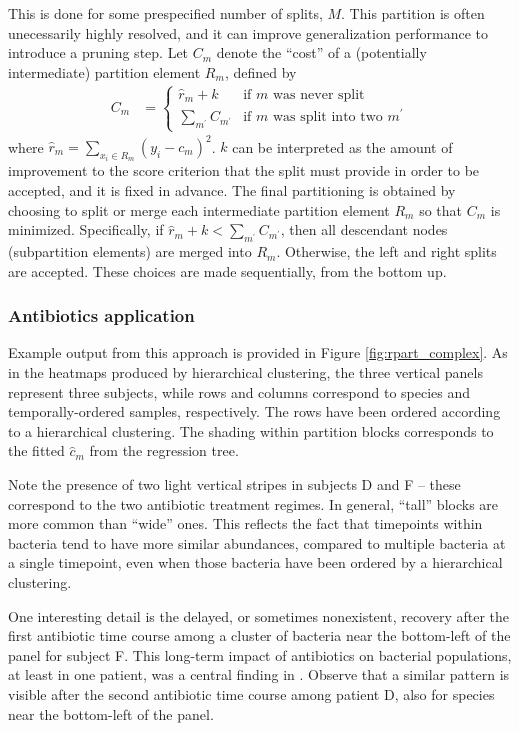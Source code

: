 \documentclass[14pt]{extreport}
\begin{document}
This is done for some prespecified number of splits, $M$. This partition is
often unecessarily highly resolved, and it can improve generalization
performance to introduce a pruning step. Let $C_{m}$ denote the ``cost'' of a
(potentially intermediate) partition element $R_{m}$, defined by
\begin{align*}
  C_{m} &= \begin{cases}
    \hat{r}_{m} + k & \text{if $m$ was never split} \\
    \sum_{m^\prime} C_{m^{\prime}} & \text{if $m$ was split into two $m^{\prime}$}
    \end{cases}
\end{align*}
where $\hat{r}_{m} = \sum_{x_{i} \in R_{m}} \left(y_{i} - c_{m}\right)^{2}$. $k$
can be interpreted as the amount of improvement to the score criterion that the
split must provide in order to be accepted, and it is fixed in advance. The
final partitioning is obtained by choosing to split or merge each intermediate
partition element $R_m$ so that $C_{m}$ is minimized. Specifically, if
$\hat{r}_{m} + k < \sum_{m^{\prime}} C_{m^{\prime}}$, then all descendant nodes
(subpartition elements) are merged into $R_{m}$. Otherwise, the left and right
splits are accepted. These choices are made sequentially, from the bottom up.

\subsubsection{Antibiotics application}
\label{subsubsec:antibiotics_application}

Example output from this approach is provided in Figure \ref{fig:rpart_complex}.
As in the heatmaps produced by hierarchical clustering, the three vertical
panels represent three subjects, while rows and columns correspond to species
and temporally-ordered samples, respectively. The rows have been ordered
according to a hierarchical clustering. The shading within partition blocks
corresponds to the fitted $\hat{c}_{m}$ from the regression tree.

Note the presence of two light vertical stripes in subjects D and F -- these
correspond to the two antibiotic treatment regimes. In general, ``tall'' blocks
are more common than ``wide'' ones. This reflects the fact that timepoints
within bacteria tend to have more similar abundances, compared to multiple
bacteria at a single timepoint, even when those bacteria have been ordered by a
hierarchical clustering.

One interesting detail is the delayed, or sometimes nonexistent, recovery after
the first antibiotic time course among a cluster of bacteria near the bottom-left of
the panel for subject F. This long-term impact of antibiotics on bacterial
populations, at least in one patient, was a central finding in
\cite{dethlefsen2011incomplete}. Observe that a similar pattern is visible after
the second antibiotic time course among patient D, also for species near the
bottom-left of the panel.
\end{document}

